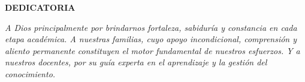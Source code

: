 
\ifmostrardedicatoria
\newpage
\begin{center}
  {\fontsize{10pt}{13pt}\selectfont \textbf{DEDICATORIA}}
\end{center}

\vspace*{6cm}

\begin{flushright}
\begin{minipage}{0.65\textwidth}
  \textit{A Dios principalmente por brindarnos fortaleza, sabiduría y constancia en cada etapa académica. A nuestras familias, cuyo apoyo incondicional, comprensión y aliento permanente constituyen el motor fundamental de nuestros esfuerzos. Y a nuestros docentes, por su guía experta en el aprendizaje y la gestión del conocimiento.}
\end{minipage}
\end{flushright}
\fi
